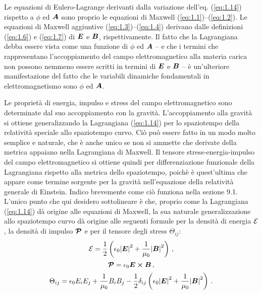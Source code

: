 Le equazioni di Eulero-Lagrange derivanti dalla variazione dell'eq. (\ref{eq:1.14}) rispetto a $\phi$ ed $\vb*{A}$ sono proprio le equazioni di Maxwell (\ref{eq:1.1})--(\ref{eq:1.2}). Le equazioni di Maxwell aggiuntive (\ref{eq:1.3})--(\ref{eq:1.4}) derivano dalle definizioni (\ref{eq:1.6}) e (\ref{eq:1.7}) di $\vb*{E}$ e $\vb*{B}$, rispettivamente. Il fatto che la Lagrangiana debba essere vista come una funzione di $\phi$ ed $\vb*{A}$ -- e che i termini che rappresentano l'accoppiamento del campo elettromagnetico alla materia carica non possono nemmeno essere scritti in termini di $\vb*{E}$ e $\vb*{B}$ -- è un'ulteriore manifestazione del fatto che le variabili dinamiche fondamentali in elettromagnetismo sono $\phi$ ed $\vb*{A}$.

Le proprietà di energia, impulso e stress del campo elettromagnetico sono determinate dal suo accoppiamento con la gravità. L'accoppiamento alla gravità si ottiene generalizzando la Lagrangiana (\ref{eq:1.14}) per lo spaziotempo della relatività speciale allo spaziotempo curvo. Ciò può essere fatto in un modo molto semplice e naturale, che è anche unico se non si ammette che derivate della metrica appaiano nella Lagrangiana di Maxwell. Il tensore stress-energia-impulso del campo elettromagnetico si ottiene quindi per differenziazione funzionale della Lagrangiana rispetto alla metrica dello spaziotempo, poichè è quest'ultima che appare come termine sorgente per la gravità nell'equazione della relatività generale di Einstein. Indico brevemente come ciò funziona nella sezione 9.1. L'unico punto che qui desidero sottolineare è che, proprio come la Lagrangiana (\ref{eq:1.14}) dà origine alle equazioni di Maxwell, la sua naturale generalizzazione allo spaziotempo curvo dà origine alle seguenti formule per la densità di energia $\mathcal{E}$, la densità di impulso $\vb*{\cP}$ e per il tensore degli stress $\Theta_{ij}$:
\begin{equation}\label{eq:1.15}
\cE = \frac{1}{2} \left(\epsilon_0 {\abs{\vb*{E}}}^2 + \frac{1}{\mu_0} {\abs{\vb*{B}}}^2 \right)\,,
\end{equation}
\begin{equation}\label{eq:1.16}
\vb*{\cP} = \epsilon_0 \vb*{E} \cross \vb*{B}\,,
\end{equation}
\begin{equation}\label{eq:1.17}
\Theta_{ij} =  \epsilon_0 E_iE_j + \frac{1}{\mu_0} B_iB_j
- \frac{1}{2} \delta_{ij} \left(\epsilon_0 {\abs{\vb*{E}}}^2 + \frac{1}{\mu_0} {\abs{\vb*{B}}}^2 \right)\,.
\end{equation}

